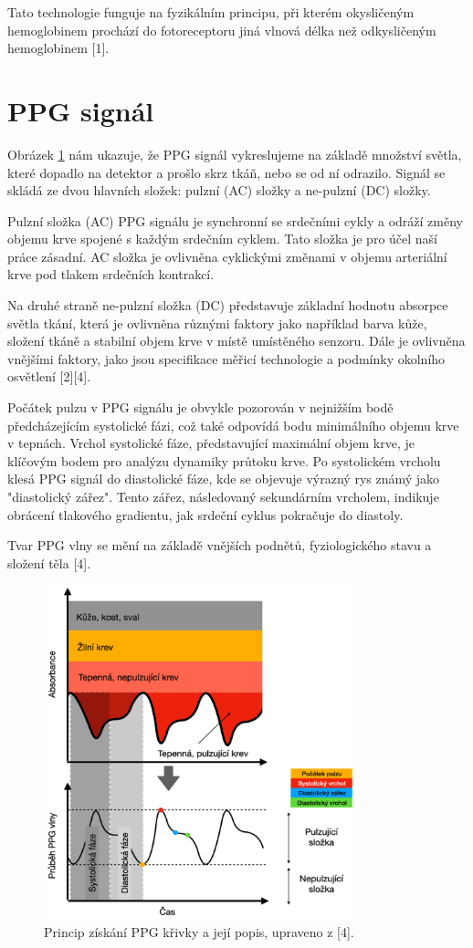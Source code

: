 Tato technologie funguje na fyzikálním principu, při kterém okysličeným hemoglobinem prochází do fotoreceptoru jiná vlnová délka než odkysličeným hemoglobinem [1].

\section{\acs{PPG} signál}

Obrázek \ref{fig:signalPPG} nám ukazuje, že \acs{PPG} signál vykreslujeme na základě množství světla, které dopadlo na detektor a prošlo skrz tkáň, nebo se od ní odrazilo.
Signál se skládá ze dvou hlavních složek: pulzní (\acs{AC}) složky a ne-pulzní (\acs{DC}) složky.

Pulzní složka (\acs{AC}) \acs{PPG} signálu je synchronní se srdečními cykly a odráží změny objemu krve spojené s každým srdečním cyklem.
Tato složka je pro účel naší práce zásadní.
\acs{AC} složka je ovlivněna cyklickými změnami v objemu arteriální krve pod tlakem srdečních kontrakcí.

Na druhé straně ne-pulzní složka (\acs{DC}) představuje základní hodnotu absorpce světla tkání, která je ovlivněna různými faktory jako například barva kůže, složení tkáně a stabilní objem krve v místě umístěného senzoru.
Dále je ovlivněna vnějšími faktory, jako jsou specifikace měřicí technologie a podmínky okolního osvětlení [2][4].

Počátek pulzu v \acs{PPG} signálu je obvykle pozorován v nejnižším bodě předcházejícím systolické fázi, což také odpovídá bodu minimálního objemu krve v tepnách.
Vrchol systolické fáze, představující maximální objem krve, je klíčovým bodem pro analýzu dynamiky průtoku krve.
Po systolickém vrcholu klesá \acs{PPG} signál do diastolické fáze, kde se objevuje výrazný rys známý jako "diastolický zářez".
Tento zářez, následovaný sekundárním vrcholem, indikuje obrácení tlakového gradientu, jak srdeční cyklus pokračuje do diastoly.

Tvar \acs{PPG} vlny se mění na základě vnějších podnětů, fyziologického stavu a složení těla [4].

\begin{figure}[ht]
	\centering
	\includegraphics[width=0.8\textwidth]{./obrazky/signalPPG.png}
	\caption{Princip získání \acs{PPG} křivky a její popis, upraveno z [4].}
	\label{fig:signalPPG}
\end{figure}